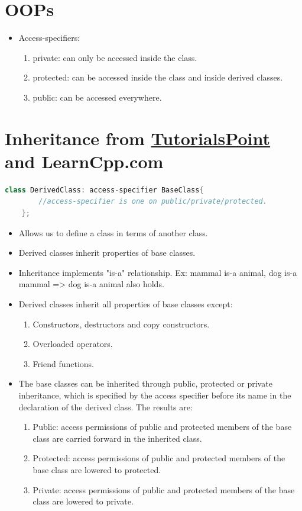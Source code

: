 \documentclass{report}
\begin{document}
\section{OOPs}
\begin{itemize}
    \item Access-specifiers:
    \begin{enumerate}
        \item private: can only be accessed inside the class.
        \item protected: can be accessed inside the class and inside derived classes.
        \item public: can be accessed everywhere.
    \end{enumerate}
\end{itemize}
\section{Inheritance from \href{https://www.tutorialspoint.com/cplusplus/cpp_inheritance.htm}{TutorialsPoint} and LearnCpp.com}
\begin{lstlisting}[language=C++,caption=Syntax]
    class DerivedClass: access-specifier BaseClass{
        //access-specifier is one on public/private/protected.
    };
\end{lstlisting}
\begin{itemize}
    \item Allows us to define a class in terms of another class.
    \item Derived classes inherit properties of base classes.
    \item Inheritance implements "is-a" relationship. Ex: mammal is-a animal, dog is-a mammal => dog is-a animal also holds.
    \item Derived classes inherit all properties of base classes except:
    \begin{enumerate}
        \item Constructors, destructors and copy constructors.
        \item Overloaded operators.
        \item Friend functions.
    \end{enumerate}
    \item The base classes can be inherited through public, 
    protected or private inheritance, which is specified by the 
    access specifier before its name in the declaration of the 
    derived class. The results are:
    \begin{enumerate}
        \item Public: access permissions of public and protected members of the base class are carried forward in the inherited class.
        \item Protected: access permissions of public and protected members of the base class are lowered to protected.
        \item Private: access permissions of public and protected members of the base class are lowered to private.
    \end{enumerate}
\end{itemize}
\end{document}
